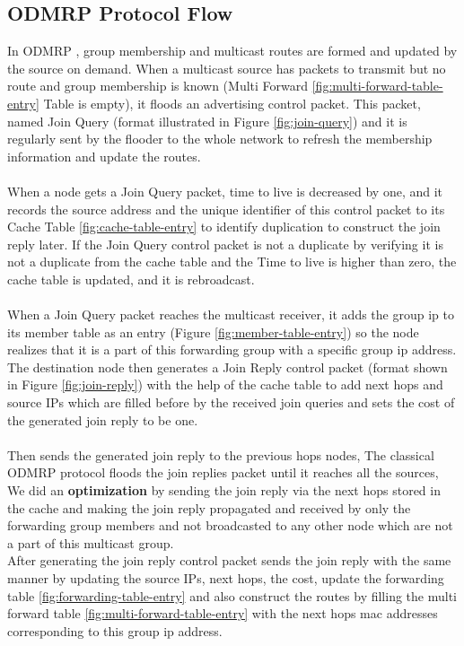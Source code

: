 \subsection{ODMRP Protocol Flow}
\label{sec:odmrp-protocol-flow}
In ODMRP \cite{ODMRP}, group membership and multicast routes are formed and updated by the source on demand. When a multicast source has packets to transmit but no route and group membership is known (Multi Forward \ref{fig:multi-forward-table-entry} Table is empty), it floods an advertising control packet. This packet, named Join Query (format illustrated in Figure \ref{fig:join-query}) and it is regularly sent by the flooder to the whole network to refresh the membership information and update the routes.
\\
\\
When a node gets a Join Query packet, time to live is decreased by one, and it records the source address and the unique identifier of this control packet to its Cache Table \ref{fig:cache-table-entry} to identify duplication to construct the join reply later.
If the Join Query control packet is not a duplicate by verifying it is not a duplicate from the cache table and the Time to live is higher than zero, the cache table is updated, and it is rebroadcast.
\\
\\
When a Join Query packet reaches the multicast receiver, it adds the group \acrshort{ip} to its member table as an entry (Figure \ref{fig:member-table-entry}) so the node realizes that it is a part of this forwarding  group with a specific group \acrshort{ip} address.
\\
The destination node then generates a Join Reply control packet (format shown in Figure \ref{fig:join-reply}) with the help of the cache table to add next hops and source IPs which are filled before by the received join queries and sets the cost of the generated join reply to be one.
\\
\\
Then sends the generated join reply to the previous hops nodes, The classical ODMRP protocol floods the join replies packet until it reaches all the sources, We did an \textbf{optimization} by sending the join reply via the next hops stored in the cache and making the join reply propagated and received by only the forwarding group members and not broadcasted to any other node which are not a part of this multicast group.
\\
After generating the join reply control packet sends the join reply with the same manner by updating the source IPs, next hops, the cost, update the forwarding table \ref{fig:forwarding-table-entry} and also construct the routes by filling the multi forward table \ref{fig:multi-forward-table-entry} with the next hops \acrshort{mac} addresses corresponding to this group \acrshort{ip} address.
